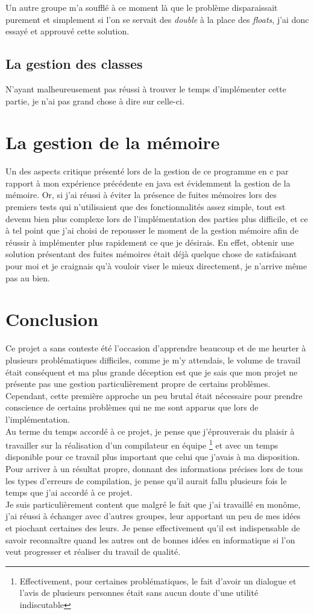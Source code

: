 \documentclass[12pt]{article}
\begin{document}
Un autre groupe m'a soufflé à ce moment là que le problème disparaissait
purement et simplement si l'on se servait des {\em double} à la place des
{\em floats}, j'ai donc essayé et approuvé cette solution.

\subsection{La gestion des classes}
N'ayant malheureusement pas réussi à trouver le temps d'implémenter cette
partie, je n'ai pas grand chose à dire sur celle-ci.

\section{La gestion de la mémoire}
Un des aspects critique présenté lors de la gestion de ce programme en c par
rapport à mon expérience précédente en java est évidemment la gestion de
la mémoire. Or, si j'ai réussi à éviter la présence de fuites mémoires lors
des premiers tests qui n'utilisaient que des fonctionnalités assez simple,
tout est devenu bien plus complexe lors de l'implémentation des parties plus
difficile, et ce à tel point que j'ai choisi de repousser le moment de la
gestion mémoire afin de réussir à implémenter plus rapidement ce que je
désirais. En effet, obtenir une solution présentant des fuites mémoires était
déjà quelque chose de satisfaisant pour moi et je craignais qu'à vouloir
viser le mieux directement, je n'arrive même pas au bien.

\section{Conclusion}
Ce projet a sans conteste été l'occasion d'apprendre beaucoup et de me
heurter à plusieurs problématiques difficiles, comme je m'y attendais, le
volume de travail était conséquent et ma plus grande déception est que je
sais que mon projet ne présente pas une gestion particulièrement propre de
certains problèmes. Cependant, cette première approche un peu brutal était
nécessaire pour prendre conscience de certains problèmes qui ne me sont
apparus que lors de l'implémentation.\\

Au terme du temps accordé à ce projet, je pense que j'éprouverais du plaisir
à travailler sur la réalisation d'un compilateur en équipe
\footnote{Effectivement, pour certaines problématiques, le fait d'avoir un
dialogue et l'avis de plusieurs personnes était sans aucun doute d'une
utilité indiscutable} et avec un temps disponible pour ce travail plus
important que celui que j'avais à ma disposition. Pour arriver à un résultat
propre, donnant des informations précises lors de tous les types d'erreurs
de compilation, je pense qu'il aurait fallu plusieurs fois le temps que j'ai
accordé à ce projet.\\

Je suis particulièrement content que malgré le fait que j'ai travaillé en
monôme, j'ai réussi à échanger avec d'autres groupes, leur apportant un peu
de mes idées et piochant certaines des leurs. Je pense effectivement qu'il
est indispensable de savoir reconnaître quand les autres ont de bonnes idées
en informatique si l'on veut progresser et réaliser du travail de qualité.
\end{document}
